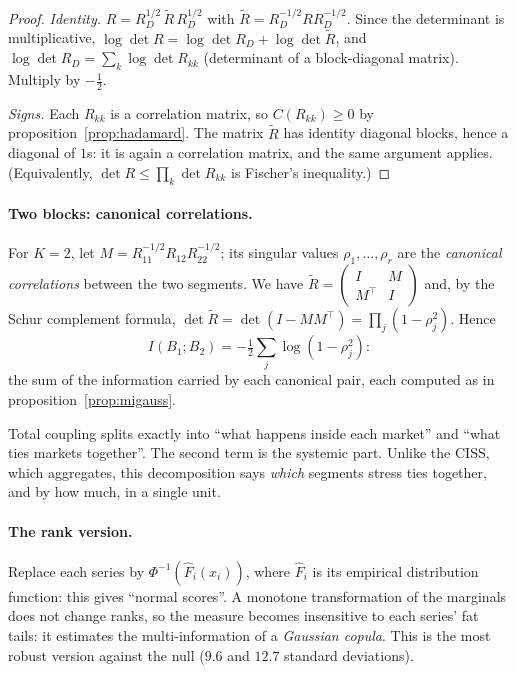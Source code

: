 \documentclass[11pt]{article}
\theoremstyle{plain}
\theoremstyle{definition}
\theoremstyle{remark}
\begin{document}
\begin{proof}
\emph{Identity.} $R=R_D^{1/2}\,\tilde R\,R_D^{1/2}$ with
$\tilde R=R_D^{-1/2}RR_D^{-1/2}$. Since the determinant is multiplicative,
$\log\det R=\log\det R_D+\log\det\tilde R$, and
$\log\det R_D=\sum_k\log\det R_{kk}$ (determinant of a block-diagonal matrix).
Multiply by $-\tfrac12$.

\emph{Signs.} Each $R_{kk}$ is a correlation matrix, so $C(R_{kk})\ge0$ by
proposition~\ref{prop:hadamard}. The matrix $\tilde R$ has identity diagonal
blocks, hence a diagonal of $1$s: it is again a correlation matrix, and the
same argument applies. (Equivalently, $\det R\le\prod_k\det R_{kk}$ is
Fischer's inequality.)
\end{proof}

\paragraph{Two blocks: canonical correlations.} For $K=2$, let
$M=R_{11}^{-1/2}R_{12}R_{22}^{-1/2}$; its singular values $\rho_1,\dots,\rho_r$
are the \emph{canonical correlations} between the two segments. We have
$\tilde R=\begin{pmatrix}I&M\\M^\top&I\end{pmatrix}$ and, by the Schur
complement formula, $\det\tilde R=\det(I-MM^\top)=\prod_j(1-\rho_j^2)$. Hence
\[
I(B_1;B_2)=-\tfrac12\sum_j\log(1-\rho_j^2):
\]
the sum of the information carried by each canonical pair, each computed as
in proposition~\ref{prop:migauss}.

\begin{intuition}
Total coupling splits exactly into ``what happens inside each market'' and
``what ties markets together''. The second term is the systemic part. Unlike
the CISS, which aggregates, this decomposition says \emph{which} segments
stress ties together, and by how much, in a single unit.
\end{intuition}

\paragraph{The rank version.} Replace each series by
$\Phi^{-1}(\hat F_i(x_i))$, where $\hat F_i$ is its empirical distribution
function: this gives ``normal scores''. A monotone transformation of the
marginals does not change ranks, so the measure becomes insensitive to each
series' fat tails: it estimates the multi-information of a \emph{Gaussian
copula}. This is the most robust version against the null ($9.6$ and $12.7$
standard deviations).
\end{document}
